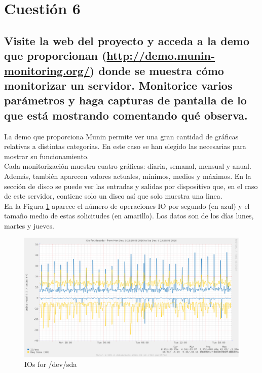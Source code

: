 \newpage


\section{Cuestión 6}
\subsection{Visite la web del proyecto y acceda a la demo que
	proporcionan (\url{http://demo.munin-monitoring.org/}) donde se muestra cómo
	monitorizar un servidor. Monitorice varios parámetros y haga capturas de
	pantalla de lo que está mostrando comentando qué observa.}

La demo que proporciona Munin permite ver una gran cantidad de gráficas relativas a distintas categorías. En este caso se han elegido las necesarias para mostrar su funcionamiento.
\\

Cada monitorización muestra cuatro gráficas: diaria, semanal, mensual y anual. Además, también aparecen valores actuales, mínimos, medios y máximos.
En la sección de disco se puede ver las entradas y salidas por dispositivo que, en el caso de este servidor, contiene solo un disco así que solo muestra una linea.
\\

En la Figura \ref{fig:figura61} aparece el número de operaciones IO por segundo (en azul) y el tamaño medio de estas solicitudes (en amarillo). Los datos son de los días lunes, martes y jueves.

\begin{figure}[H]
	\centering
	\includegraphics[scale=0.65]{figuras/ejercicio6/figura1.png} 
	\caption{IOs for /dev/sda \cite{enlace5}} 
	\label{fig:figura61}
\end{figure}

